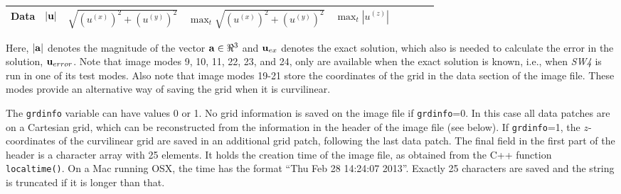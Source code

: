 \documentclass[11pt]{report}
\newcommand{\ub}{{\bf u}}
\begin{document}
{\begin{flushleft}
\begin{tabular}{l||l|l|l|lllll}
		Data       & $|\ub|$ & $\sqrt{(u^{(x)})^2+(u^{(y)})^2}$ & $\max_t\sqrt{(u^{(x)})^2+(u^{(y)})^2}$ & $\max_t
		\left| u^{(z)} \right|$                                                                                    \\ \hline
	\end{tabular}
\end{flushleft}
Here, $|{\bf a}|$ denotes the magnitude of the vector ${\bf a}\in\Re^3$ and $\ub_{ex}$ denotes the
exact solution, which also is needed to calculate the error in the solution, $\ub_{error}$. Note
that image modes 9, 10, 11, 22, 23, and 24, only are available when the exact solution is known,
i.e., when \emph{SW4} is run in one of its test modes. Also note that image modes 19-21 store the
coordinates of the grid in the data section of the image file. These modes provide an alternative
way of saving the grid when it is curvilinear.

The {\tt grdinfo} variable can have values 0 or 1. No grid information is saved on the image file if
	{\tt grdinfo}=0. In this case all data patches are on a Cartesian grid, which can be reconstructed
from the information in the header of the image file (see below). If {\tt grdinfo}=1, the
$z$-coordinates of the curvilinear grid are saved in an additional grid patch, following
the last data patch. The final field in the first part of the header is a character array with 25
elements. It holds the creation time of the image file, as obtained from the C++ function {\tt
		localtime()}. On a Mac running OSX, the time has the format ``Thu Feb 28 14:24:07 2013''. Exactly
25 characters are saved and the string is truncated if it is longer than that.

}
\end{document}
